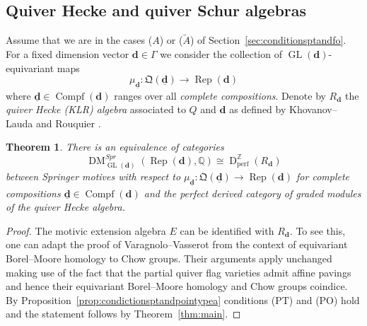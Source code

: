 \documentclass{amsart}
\theoremstyle{plain}
\newtheorem{theorem}{Theorem}[section]
\theoremstyle{TheoremNum}
\theoremstyle{definition}
\theoremstyle{remark}
\numberwithin{equation}{section}
\newcommand{\Q}{\mathbb{Q}}
\newcommand{\Z}{\mathbb{Z}}
\newcommand{\Chow}{\operatorname{CH}}
\newcommand{\QQ}{\mathfrak{Q}}
\newcommand{\DM}{\operatorname{DM}}
\newcommand{\DperfZ}{\operatorname{D}^\Z_{\operatorname{perf}}}
\newcommand{\GL}{\operatorname{GL}}
\newcommand{\Compf}{\operatorname{Compf}}
\newcommand{\Rep}{\operatorname{Rep}}
\begin{document}
\subsection{Quiver Hecke and quiver Schur algebras}
Assume that we are in the cases ($A$) or ($\widetilde{A}$) of Section~\ref{sec:conditionsptandfo}. For a fixed dimension vector $\mathbf{d}\in \Gamma$ we consider the collection of $\GL(\mathbf{d})$-equivariant maps 
$$\mu_{\underline{\mathbf{d}}}:\QQ(\underline{\mathbf{d}})\to \Rep(\mathbf{d})$$
where $\underline{\mathbf{d}}\in \Compf(\mathbf{d})$ ranges over all \emph{complete compositions}. 
Denote by $R_\mathbf{d}$ the \emph{quiver Hecke (KLR) algebra} associated to $Q$ and $\mathbf{d}$ as defined by Khovanov--Lauda \cite{khovanov_diagrammatic_2009} and Rouquier \cite{rouquier_2-kac-moody_2008}. 

\begin{theorem}\label{thm:quiverheckealgebra}
There is an equivalence of categories 
$$\DM^{Spr}_{\GL(\mathbf{d})}(\Rep(\mathbf{d}),\Q)\cong \DperfZ(R_\mathbf{d})$$ 
between Springer motives with respect to $\mu_{\underline{\mathbf{d}}}:\QQ(\underline{\mathbf{d}})\to \Rep(\mathbf{d})$ for complete compositions $\underline{\mathbf{d}}\in \Compf(\mathbf{d})$ and the perfect derived category of graded modules of the quiver Hecke algebra.
\end{theorem}
\begin{proof}
The motivic extension algebra $E$ can be identified with $R_\mathbf{d}.$ To see this, one can adapt the proof of Varagnolo--Vasserot \cite[Theorem 3.6]{varagnolo_canonical_2011} from the context of equivariant Borel--Moore homology to Chow groups. Their arguments apply unchanged making use of the fact that the partial quiver flag varieties admit affine pavings and hence their equivariant Borel--Moore homology and Chow groups coindice.
By Proposition~\ref{prop:condictionsptandpointypea} conditions (PT) and (PO) hold and the statement follows by Theorem~\ref{thm:main}.
\end{proof}
\end{document}
